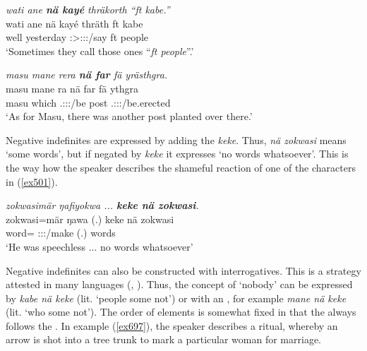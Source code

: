 \begin{exe}
	\ex \emph{wati ane \textbf{nä kayé} thräkorth ``ft kabe.''}\\
	\gll wati ane nä kayé thräth ft kabe\\
	well {\Dem} {\Indf} yesterday \Stpl:\Sbj>\Stpl:\Obj:\Irr:\Pfv/say ft people\\
	\trans `Sometimes they call those ones ``\emph{ft people}''.' 
	\label{ex720}
\end{exe}
\begin{exe}
	\ex \emph{masu mane rera \textbf{nä far} fä yrästhgra.}\\
	\gll masu mane ra nä far fä ythgra\\
	masu which \Tsg.\F:\Sbj:\Pst:\Ipfv/be {\Indf} post {\Dist} \Tsg.\Masc:\Sbj:\Pst:\Stat/be.erected\\
	\trans `As for Masu, there was another post planted over there.'
	\label{ex500}
\end{exe}

Negative indefinites are expressed by adding the  \emph{keke}. Thus, \emph{nä zokwasi} means `some words', but if negated by \emph{keke} it expresses `no words whatsoever'. This is the way how the speaker describes the shameful reaction of one of the characters in (\ref{ex501}).

\begin{exe}
	\ex \emph{zokwasimär ŋafiyokwa ... \textbf{keke nä zokwasi}.}\\
	\gll zokwasi=mär ŋawa (.) keke nä zokwasi\\
	word={\Priv} \Stsg:\Sbj:\Pst:\Ipfv/make (.) {\Neg} {\Indf} words\\
	\trans `He was speechless ... no words whatsoever' 
	\label{ex501}
\end{exe}

Negative indefinites can also be constructed with interrogatives. This is a strategy attested in many languages (\citealt{Haspelmath:1997indefinite}, \citealt{wals-115}). Thus, the concept of `nobody' can be expressed by \emph{kabe nä keke} (lit. `people some not') or with an , for example \emph{mane nä keke} (lit. `who some not'). The order of elements is somewhat fixed in that the  always follows the . In example (\ref{ex697}), the speaker describes a ritual, whereby an arrow is shot into a tree trunk to mark a particular woman for marriage.

